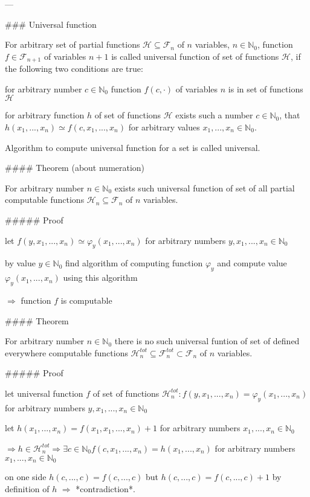 \documentclass[12pt,letterpaper]{report}
\begin{document}
---

### Universal function

For arbitrary set of partial functions $\mathcal{H} \subseteq \mathcal{F}_n$ of $n$ variables, $n \in \mathbb{N}_0$, function $f \in \mathcal{F}_{n+1}$ of variables $n+1$ is called universal function of set of functions $\mathcal{H}$, if the following two conditions are true:
\item for arbitrary number $c \in \mathbb{N}_0$ function $f(c, \cdot)$ of variables $n$ is in set of functions $\mathcal{H}$
\item for arbitrary function $h$ of set of functions $\mathcal{H}$ exists such a number $c \in \mathbb{N}_0$, that $h(x_1, ..., x_n) \simeq f(c, x_1, ..., x_n)$ for arbitrary values $x_1, ..., x_n \in \mathbb{N}_0$.

Algorithm to compute universal function for a set is called universal.

#### Theorem (about numeration)

For arbitrary number $n \in \mathbb{N}_0$ exists such universal function of set of all partial computable functions $\mathcal{H}_n \subseteq \mathcal{F}_n$ of $n$ variables.

##### Proof
\item let $f(y, x_1, ..., x_n) \simeq \varphi_y(x_1, ..., x_n)$ for arbitrary numbers $y, x_1, ..., x_n \in \mathbb{N}_0$
\item by value $y \in \mathbb{N}_0$ find algorithm of computing function $\varphi_y$ and compute value $\varphi_y(x_1, ..., x_n)$ using this algorithm
\item $\Rightarrow$ function $f$ is computable

#### Theorem

For arbitrary number $n \in \mathbb{N}_0$ there is no such universal funtion of set of defined everywhere computable functions $\mathcal{H}_n^{tot} \subseteq \mathcal{F}_n^{tot} \subset \mathcal{F}_n$ of $n$ variables.

##### Proof
\item let universal function $f$ of set of functions $\mathcal{H}_n^{tot} : f(y, x_1, ..., x_n) = \varphi_y(x_1, ..., x_n)$ for arbitrary numbers $y, x_1, ..., x_n \in \mathbb{N}_0$
\item let $h(x_1, ..., x_n) = f(x_1, x_1, ..., x_n) + 1$ for arbitrary numbers $x_1, ..., x_n \in \mathbb{N}_0$
\item $\Rightarrow h \in \mathcal{H}_n^{tot} \Rightarrow \exists c \in \mathbb{N}_0 f(c, x_1, ..., x_n) = h(x_1, ..., x_n)$ for arbitrary numbers $x_1, ..., x_n \in \mathbb{N}_0$
\item on one side $h(c, ..., c) = f(c, ..., c)$ but $h(c, ..., c) = f(c, ..., c) + 1$ by definition of $h$ $\Rightarrow$ *contradiction*.
\end{document}
